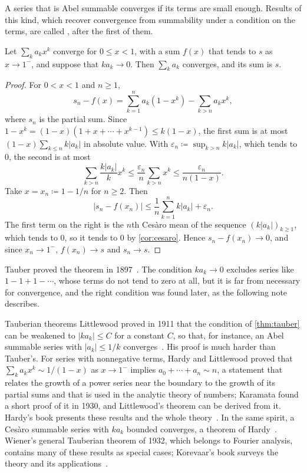 A series that is Abel summable converges if its terms are small enough. Results of this kind, which recover convergence from summability under a condition on the terms, are called , after the first of them.

\begin{theorem}[Tauber]
\label{thm:tauber}
Let $\sum_ka_kx^k$ converge for $0\le x<1$, with a sum $f(x)$ that tends to $s$ as $x\to1^-$, and suppose that $ka_k\to0$. Then $\sum_ka_k$ converges, and its sum is $s$.
\end{theorem}

\begin{proof}
For $0<x<1$ and $n\ge1$,
\[
s_n-f(x)=\sum_{k=1}^na_k(1-x^k)-\sum_{k>n}a_kx^k ,
\]
where $s_n$ is the partial sum. Since $1-x^k=(1-x)(1+x+\cdots+x^{k-1})\le k(1-x)$, the first sum is at most $(1-x)\sum_{k\le n}k|a_k|$ in absolute value. With $\varepsilon_n\coloneqq\sup_{k>n}k|a_k|$, which tends to $0$, the second is at most
\[
\sum_{k>n}\frac{k|a_k|}kx^k\le\frac{\varepsilon_n}n\sum_{k>n}x^k\le\frac{\varepsilon_n}{n(1-x)} .
\]
Take $x=x_n\coloneqq1-1/n$ for $n\ge2$. Then
\[
|s_n-f(x_n)|\le\frac1n\sum_{k=1}^nk|a_k|+\varepsilon_n .
\]
The first term on the right is the $n$th Ces\`aro mean of the sequence $(k|a_k|)_{k\ge1}$, which tends to $0$, so it tends to $0$ by \cref{cor:cesaro}. Hence $s_n-f(x_n)\to0$, and since $x_n\to1^-$, $f(x_n)\to s$ and $s_n\to s$.
\end{proof}

Tauber proved the theorem in 1897~\cite{tauber1897}. The condition $ka_k\to0$ excludes series like $1-1+1-\cdots$, whose terms do not tend to zero at all, but it is far from necessary for convergence, and the right condition was found later, as the following note describes.

\begin{note}{Tauberian theorems}
Littlewood proved in 1911 that the condition of \cref{thm:tauber} can be weakened to $|ka_k|\le C$ for a constant $C$, so that, for instance, an Abel summable series with $|a_k|\le1/k$ converges~\cite{littlewood1911}. His proof is much harder than Tauber's. For series with nonnegative terms, Hardy and Littlewood proved that $\sum_ka_kx^k\sim1/(1-x)$ as $x\to1^-$ implies $a_0+\cdots+a_n\sim n$, a statement that relates the growth of a power series near the boundary to the growth of its partial sums and that is used in the analytic theory of numbers; Karamata found a short proof of it in 1930, and Littlewood's theorem can be derived from it. Hardy's book presents these results and the whole theory~\cite{hardy1949divergent}. In the same spirit, a Ces\`aro summable series with $ka_k$ bounded converges, a theorem of Hardy~\cite{hardy1949divergent}. Wiener's general Tauberian theorem of 1932, which belongs to Fourier analysis, contains many of these results as special cases; Korevaar's book surveys the theory and its applications~\cite{korevaar2004}.
\end{note}

